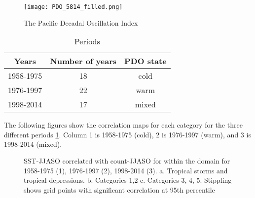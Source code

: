 \begin{figure}
	\centering
	\noindent\texttt{[image: PDO\_5814\_filled.png]} %
	\caption{The Pacific Decadal Oscillation Index}\label{fig:PDO_time}
\end{figure}

\begin{table}[h]
	\caption{Periods}\label{tperiods}
	\begin{center}
		\begin{tabular}{ccc}
			\hline\hline
			Years & Number of years & PDO state \\
			\hline
			1958-1975 & 18 & cold  \\ 
			1976-1997 & 22 & warm  \\ 
			1998-2014 & 17 & mixed  \\ 
			
			\hline
		\end{tabular}
	\end{center}
\end{table}


The following figures show the correlation maps for each category for the three different periods \ref{tperiods}. Column 1 is 1958-1975 (cold), 2 is 1976-1997 (warm), and 3 is 1998-2014 (mixed). 


\begin{figure}
	\centering %
	
	
	
	\caption{SST-JJASO correlated with count-JJASO for within the domain for 1958-1975 (1), 1976-1997 (2), 1998-2014 (3). a. Tropical storms and tropical depressions. b. Categories 1,2 c. Categories 3, 4, 5.  Stippling shows grid points with significant correlation at 95th percentile} \label{fig:corr_JJASO_periods} 
\end{figure} 

